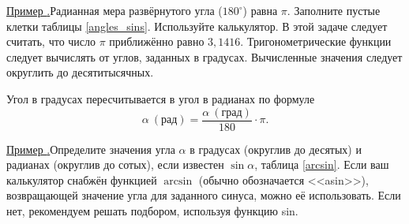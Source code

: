 \documentclass[10pt, xetex]{article}
\newcounter{zadacha}
\newcommand{\z}{\par\vspace{0.6\baselineskip plus 1pt minus 1pt}\noindent\addtocounter{zadacha}{1}\hypertarget{z\thezadacha}{}\hyperlink{an\thezadacha}{{Пример {\arabic{zadacha}.}\:\hskip0.15mm}}}
\begin{document}
\z Радианная мера развёрнутого угла ($180^{\circ}$) равна $\pi$. Заполните пустые клетки таблицы \ref{angles_sins}. Используйте калькулятор. В этой задаче следует считать, что число $\pi$ приближённо равно $3{,}1416$. Тригонометрические функции следует вычислять от углов, заданных в градусах. Вычисленные значения следует округлить до десятитысячных. 
\vskip 0.2cm
\begin{table}[h]
\renewcommand{\arraystretch}{1.6} %
\renewcommand{\tabcolsep}{12 pt}
\small
{}
\caption{}
\label{angles_sins}
\end{table}
\normalsize
\indent Угол в градусах пересчитывается в угол в радианах по формуле
\setlength{\belowdisplayskip}{0.4\baselineskip} 
\setlength{\abovedisplayskip}{0.4\baselineskip}
\begin{equation*}
\alpha\:(\text{рад}) = \frac{\alpha\:(\text{град})}{180}\cdot \pi.
\end{equation*}

\z Определите значения угла $\alpha$ в градусах (округлив до десятых) и радианах (округлив до сотых), если известен $\sin\alpha$, таблица \ref{arcsin}. Если ваш калькулятор снабжён функцией $\arcsin$ (обычно обозначается <<asin>>), возвращающей значение угла для заданного синуса, можно её использовать. Если нет, рекомендуем решать подбором, используя функцию sin.
\vskip 0.2cm
\begin{table}[h]
\renewcommand{\arraystretch}{1.6} %
\renewcommand{\tabcolsep}{12 pt}
\small
{}
\caption{}
\label{arcsin}
\end{table}
\end{document}
